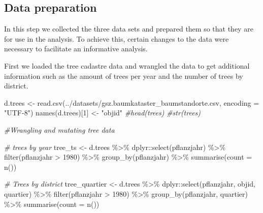 \documentclass[
]{article}
\newenvironment{Shaded}{\begin{snugshade}}{\end{snugshade}}
\newcommand{\AttributeTok}[1]{\textcolor[rgb]{0.77,0.63,0.00}{#1}}
\newcommand{\CommentTok}[1]{\textcolor[rgb]{0.56,0.35,0.01}{\textit{#1}}}
\newcommand{\DecValTok}[1]{\textcolor[rgb]{0.00,0.00,0.81}{#1}}
\newcommand{\FunctionTok}[1]{\textcolor[rgb]{0.00,0.00,0.00}{#1}}
\newcommand{\NormalTok}[1]{#1}
\newcommand{\OtherTok}[1]{\textcolor[rgb]{0.56,0.35,0.01}{#1}}
\newcommand{\SpecialCharTok}[1]{\textcolor[rgb]{0.00,0.00,0.00}{#1}}
\newcommand{\StringTok}[1]{\textcolor[rgb]{0.31,0.60,0.02}{#1}}
\begin{document}
\hypertarget{data-preparation}{%
\subsection{Data preparation}\label{data-preparation}}

In this step we collected the three data sets and prepared them so that
they are for use in the analysis. To achieve this, certain changes to
the data were necessary to facilitate an informative analysis.

First we loaded the tree cadastre data and wrangled the data to get
additional information such as the amount of trees per year and the
number of trees by district.

\begin{Shaded}
\begin{Highlighting}[]
\NormalTok{d.trees }\OtherTok{\textless{}{-}} \FunctionTok{read.csv}\NormalTok{(}\StringTok{\textquotesingle{}../datasets/gsz.baumkataster\_baumstandorte.csv\textquotesingle{}}\NormalTok{, }\AttributeTok{encoding =} \StringTok{"UTF{-}8"}\NormalTok{)}
\FunctionTok{names}\NormalTok{(d.trees)[}\DecValTok{1}\NormalTok{] }\OtherTok{\textless{}{-}} \StringTok{"objid"} 
\CommentTok{\#head(trees)}
\CommentTok{\#str(trees)}


\CommentTok{\#Wrangling and mutating tree data}

\CommentTok{\# trees by year}
\NormalTok{tree\_ts }\OtherTok{\textless{}{-}}\NormalTok{ d.trees }\SpecialCharTok{\%\textgreater{}\%}
\NormalTok{  dplyr}\SpecialCharTok{::}\FunctionTok{select}\NormalTok{(pflanzjahr) }\SpecialCharTok{\%\textgreater{}\%}
  \FunctionTok{filter}\NormalTok{(pflanzjahr }\SpecialCharTok{\textgreater{}} \DecValTok{1980}\NormalTok{) }\SpecialCharTok{\%\textgreater{}\%}
  \FunctionTok{group\_by}\NormalTok{(pflanzjahr) }\SpecialCharTok{\%\textgreater{}\%}
  \FunctionTok{summarise}\NormalTok{(}\AttributeTok{count =} \FunctionTok{n}\NormalTok{())}

\CommentTok{\# Trees by district}
\NormalTok{tree\_quartier }\OtherTok{\textless{}{-}}\NormalTok{ d.trees }\SpecialCharTok{\%\textgreater{}\%}
\NormalTok{  dplyr}\SpecialCharTok{::}\FunctionTok{select}\NormalTok{(pflanzjahr, objid, quartier) }\SpecialCharTok{\%\textgreater{}\%}
  \FunctionTok{filter}\NormalTok{(pflanzjahr }\SpecialCharTok{\textgreater{}} \DecValTok{1980}\NormalTok{) }\SpecialCharTok{\%\textgreater{}\%}
  \FunctionTok{group\_by}\NormalTok{(pflanzjahr, quartier) }\SpecialCharTok{\%\textgreater{}\%}
  \FunctionTok{summarise}\NormalTok{(}\AttributeTok{count =} \FunctionTok{n}\NormalTok{())}



\end{Highlighting}
\end{Shaded}
\end{document}

